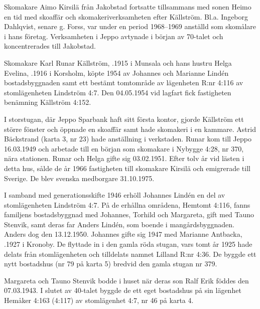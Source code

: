 %
Skomakare Aimo Kirsilä från Jakobstad fortsatte tillsammans med sonen Heimo en tid med skoaffär och skomakeriverksamheten efter Källström. Bl.a. Ingeborg Dahlqvist, senare g. Forss, var under en period 1968--1969 anställd som skomålare i hans företag. Verksamheten i Jeppo avtynade i början av 70-talet och koncentrerades till Jakobstad.


%
Skomakare Karl Runar Källström, .1915 i Munsala och hans hustru Helga Evelina, .1916 i Korsholm, köpte 1954 av Johannes och Marianne Lindén bostadsbyggnaden samt ett bestämt tomtområde av lägenheten R:nr 4:116  av stomlägenheten Lindström 4:7. Den 04.05.1954 vid lagfart fick fastigheten benämning Källström 4:152.

I storstugan, där Jeppo Sparbank haft sitt första kontor, gjorde Källström ett större fönster och	öppnade en skoaffär samt hade skomakeri i en kammare. Astrid Bäckstrand (karta 3, nr 23) hade anställning i verkstaden. Runar kom till Jeppo 16.03.1949 och arbetade till en början som skomakare i Nybygge 4:28, nr 370, nära stationen. Runar och Helga gifte sig 03.02.1951. Efter tolv år vid lästen i detta hus, sålde de år 1966 fastigheten till skomakare Kirsilä och emigrerade till Sverige. De blev svenska medborgare 31.10.1975.


%
I samband med generationsskifte 1946 erhöll Johannes Lindén en del av stomlägenheten Lindström 4:7. På de erhållna områdena, Hemtomt 4:116, fanns familjens bostadsbyggnad med Johannes, Torhild och Margareta, gift med Tauno Stenvik, samt deras far Anders Lindén, som boende i mangårdsbyggnaden. Anders dog den 13.12.1950. Johannes gifte sig 1947 med Marianne Antbacka, .1927 i Kronoby. De flyttade in i den gamla röda stugan, vars tomt år 1925 hade delats från stomlägenheten och tilldelats namnet Lilland R:nr 4:36. De byggde ett nytt bostadshus (nr 79 på karta 5) bredvid den gamla stugan nr 379.

Margareta och Tauno Stenvik bodde i huset när deras son Ralf Erik föddes den 07.03.1943. I slutet av 40-talet byggde de ett eget bostadshus på sin lägenhet Hemåker 4:163 (4:117) av stomlägenhet 4:7, nr 46 på karta 4.

